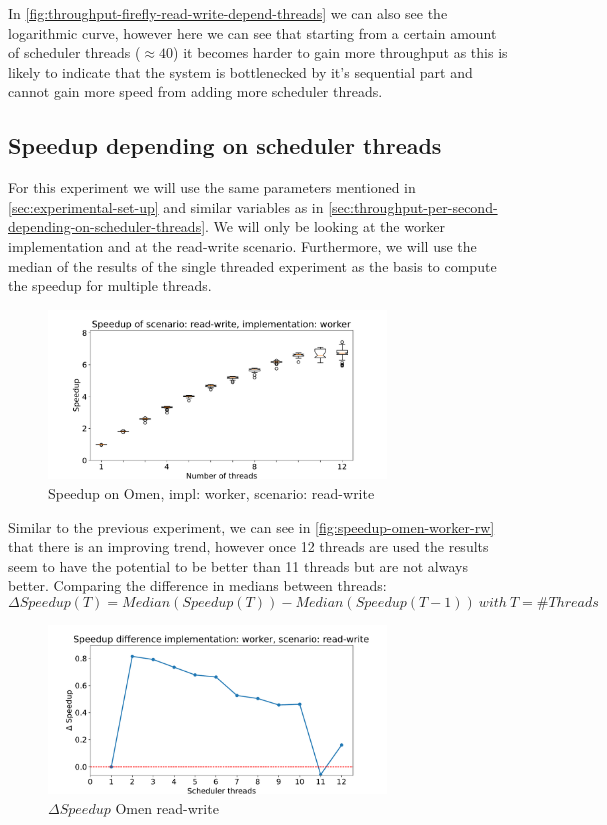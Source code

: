 \documentclass{article}
\begin{document}
In \autoref{fig:throughput-firefly-read-write-depend-threads} we can also see
the logarithmic curve, however here we can see that starting from a certain
amount of scheduler threads ($\approx 40$) it becomes harder to gain more
throughput as this is likely to indicate that the system is bottlenecked by it's
sequential part and cannot gain more speed from adding more scheduler threads.
\subsection{Speedup depending on scheduler threads}
For this experiment we will use the same parameters mentioned in
\autoref{sec:experimental-set-up} and similar variables as in
\autoref{sec:throughput-per-second-depending-on-scheduler-threads}. We will only
be looking at the worker implementation and at the read-write scenario.
Furthermore, we will use the median of the results of the single threaded
experiment as the basis to compute the speedup for multiple threads.
\begin{figure}[H]
	\centering
	\includegraphics[width=0.8\textwidth]{boxplots/omen/boxplot-speedup-of-scenario-read-write-implementation-worker.pdf}
	\caption{Speedup on Omen, impl: worker, scenario: read-write}
	\label{fig:speedup-omen-worker-rw}
\end{figure}
Similar to the previous experiment, we can see in \autoref{fig:speedup-omen-worker-rw} that there is an improving trend, however once
12 threads are used the results seem to have the potential to be better than 11
threads but are not always better.
Comparing the difference in medians between threads: $$\Delta Speedup(T) =
	Median(Speedup(T)) - Median(Speedup(T - 1))\:with\:T=\#Threads$$
\begin{figure}[H]
	\centering
	\includegraphics[width=0.8\textwidth]{plot/omen/plot-speedup-difference-implementation-worker-scenario-read-write.pdf}
	\caption{$\Delta Speedup$ Omen read-write}
	\label{fig:delta-speedup-omen-rw}
\end{figure}
\end{document}
